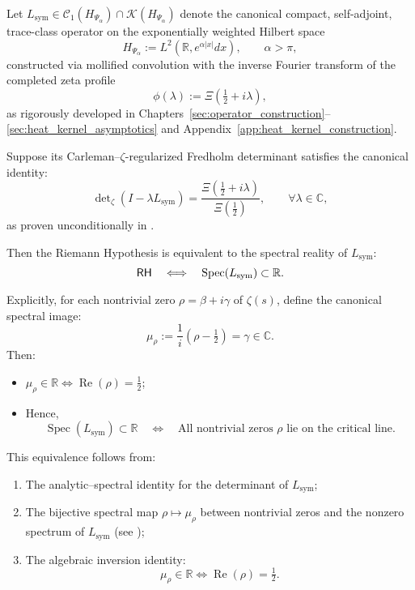 \begin{theorem}
\label{thm:eq_of_rh}

Let \( L_{\mathrm{sym}} \in \mathcal{C}_1(H_{\Psi_\alpha}) \cap \mathcal{K}(H_{\Psi_\alpha}) \) denote the canonical compact, self-adjoint, trace-class operator on the exponentially weighted Hilbert space
\[
H_{\Psi_\alpha} := L^2(\mathbb{R}, e^{\alpha |x|} dx), \qquad \alpha > \pi,
\]
constructed via mollified convolution with the inverse Fourier transform of the completed zeta profile
\[
\phi(\lambda) := \Xi\left( \tfrac{1}{2} + i\lambda \right),
\]
as rigorously developed in Chapters~\ref{sec:operator_construction}–\ref{sec:heat_kernel_asymptotics} and Appendix~\ref{app:heat_kernel_construction}.

\medskip

Suppose its Carleman–\(\zeta\)-regularized Fredholm determinant satisfies the canonical identity:
\[
\det\nolimits_\zeta(I - \lambda L_{\mathrm{sym}}) = \frac{\Xi\left( \tfrac{1}{2} + i\lambda \right)}{\Xi\left( \tfrac{1}{2} \right)},
\qquad \forall \lambda \in \mathbb{C},
\]
as proven unconditionally in .

\medskip

Then the Riemann Hypothesis is equivalent to the spectral reality of \( L_{\mathrm{sym}} \):
\[
\mathsf{RH} \quad \Longleftrightarrow \quad \operatorname{Spec}(L_{\mathrm{sym}}) \subset \mathbb{R}.
\]

\medskip

\noindent
Explicitly, for each nontrivial zero \( \rho = \beta + i\gamma \) of \( \zeta(s) \), define the canonical spectral image:
\[
\mu_\rho := \frac{1}{i}(\rho - \tfrac{1}{2}) = \gamma \in \mathbb{C}.
\]
Then:
\begin{itemize}
  \item \( \mu_\rho \in \mathbb{R} \iff \operatorname{Re}(\rho) = \tfrac{1}{2} \);
  \item Hence,
  \[
  \operatorname{Spec}(L_{\mathrm{sym}}) \subset \mathbb{R}
  \quad \Longleftrightarrow \quad
  \text{All nontrivial zeros } \rho \text{ lie on the critical line.}
  \]
\end{itemize}

\medskip

\noindent
This equivalence follows from:
\begin{enumerate}
  \item The analytic–spectral identity for the determinant of \( L_{\mathrm{sym}} \);
  \item The bijective spectral map \( \rho \mapsto \mu_\rho \) between nontrivial zeros and the nonzero spectrum of \( L_{\mathrm{sym}} \) (see );
  \item The algebraic inversion identity:
  \[
  \mu_\rho \in \mathbb{R} \iff \operatorname{Re}(\rho) = \tfrac{1}{2}.
  \]
\end{enumerate}


\end{theorem}

